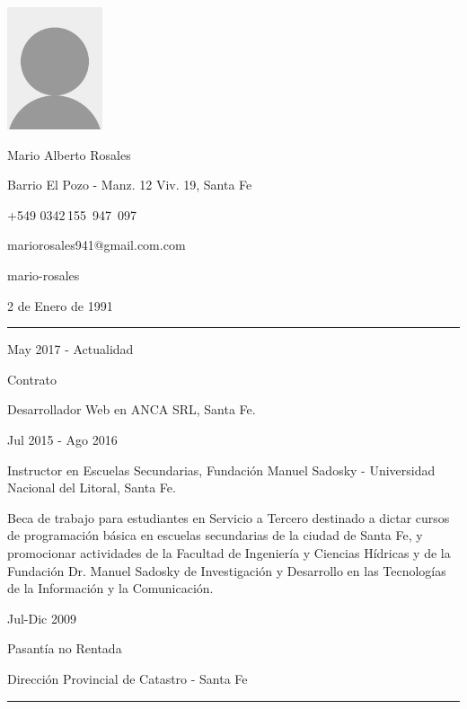\documentclass[a4paper,10pt]{article}
\newlength{\cvcolumngapwidth}
\newlength{\cvleftcolumnwidth}
\newlength{\cvrightcolumnwidth}
\newcommand{\cvnamestyle}[1]{{\Large\cvnamefont\textcolor{cvnamecolor}{#1}}}
\newcommand{\cvsectionstyle}[1]{{\normalsize\cvsectionfont\textcolor{cvsectioncolor}{#1}}}
\newcommand{\cvtitlestyle}[1]{{\large\cvtitlefont\textcolor{cvtitlecolor}{#1}}}
\newcommand{\cvdurationstyle}[1]{{\small\cvdurationfont\textcolor{cvdurationcolor}{#1}}}
\newlength{\cvafteritemskipamount}
\newlength{\cvaftersectionskipamount}
\newlength{\cvafternameskipamount}
\newlength{\cvafterpersonalinfolineskipamount}
\newlength{\cvaftertitleskipamount}
\newlength{\cvparskip}
\newcommand{\cvpersonalinfo}[2]{
    \begin{minipage}[t]{\cvleftcolumnwidth}
        \vspace{0mm} %
        \raggedleft #1
    \end{minipage}%
    \hspace{\cvcolumngapwidth}%
    \begin{minipage}[t]{\cvrightcolumnwidth}
        \vspace{0mm} %
        #2
    \end{minipage}

    \vspace{\cvafteritemskipamount}
}
\newcommand{\cvname}[1]{
    \cvnamestyle{#1}

    \vspace{\cvafternameskipamount}
}
\newcommand{\cvpersonalinfolinewithicon}[3]{
    \raisebox{.5\fontcharht\font`E-.5\height}{\texttt{[image: \#2]}}
    #3

    \vspace{\cvafterpersonalinfolineskipamount}
}
\newcommand{\cvsection}[1]{
    \begin{minipage}[t]{\cvleftcolumnwidth}
        \raggedleft\cvsectionstyle{#1}
    \end{minipage}%
    \hspace{\cvcolumngapwidth}%
    \begin{minipage}[t]{\cvrightcolumnwidth}
        \textcolor{cvrulecolor}{\rule{\cvrightcolumnwidth}{0.3mm}}
    \end{minipage}

    \vspace{\cvaftersectionskipamount}
}
\newcommand{\cvitem}[2]{
    \begin{minipage}[t]{\cvleftcolumnwidth}
        \raggedleft #1
    \end{minipage}%
    \hspace{\cvcolumngapwidth}%
    \begin{minipage}[t]{\cvrightcolumnwidth}
        \setlength{\parskip}{\cvparskip} #2
    \end{minipage}

    \vspace{\cvafteritemskipamount}
}
\newcommand{\cvtitle}[1]{
    \cvtitlestyle{#1}

    \vspace{\cvaftertitleskipamount}
    \vspace{-\cvparskip}
}
\begin{document}

\cvpersonalinfo{
    \includegraphics[height=36mm]{photo.png}
}{
    \cvname{Mario Alberto Rosales}

    \cvpersonalinfolinewithicon{height=4mm}{072-location.pdf}{
        Barrio El Pozo - Manz. 12 Viv. 19, Santa Fe
    }

    \cvpersonalinfolinewithicon{height=4mm}{067-phone.pdf}{
        +549 0342\,155\, 947 \,097
    }

    \cvpersonalinfolinewithicon{height=4mm}{070-envelop.pdf}{
        mariorosales941@gmail.com.com
    }

    \cvpersonalinfolinewithicon{height=4mm}{458-linkedin.pdf}{
        mario-rosales
    }

    2 de Enero de 1991
}



\cvsection{EXPERIENCIA LABORAL}

\cvitem{
    \cvdurationstyle{May 2017 - Actualidad}
}{
    \cvtitle{Contrato}
    Desarrollador Web en ANCA SRL, Santa Fe.
}

\cvitem{
    \cvdurationstyle{Jul 2015 - Ago 2016}
}{
    \cvtitle{Instructor en Escuelas Secundarias, Fundación Manuel Sadosky - Universidad Nacional del Litoral, Santa Fe.}
    Beca de trabajo para estudiantes en Servicio a Tercero destinado a dictar cursos de programación básica en escuelas secundarias de la ciudad de Santa Fe, y promocionar actividades de la Facultad de Ingeniería y Ciencias Hídricas y de la Fundación Dr. Manuel Sadosky de Investigación y Desarrollo en las Tecnologías de la Información y la Comunicación.
}

\cvitem{
    \cvdurationstyle{Jul-Dic 2009}
}{
    \cvtitle{Pasantía no Rentada}
    Dirección Provincial de Catastro - Santa Fe
}


\cvsection{FORMACIÓN ACADÉMICA}
\end{document}

